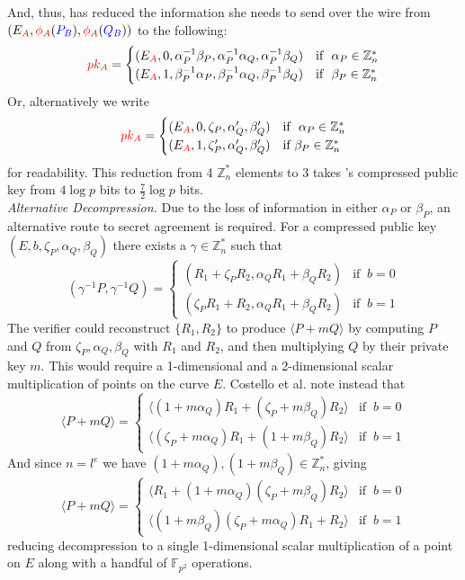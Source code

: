 \noindent
And, thus, \alice has reduced the information she needs to send over the wire from $(E_{\textcolor{red}{A}}, \textcolor{red}{\phi_A}(\textcolor{blue}{P_B}), \textcolor{red}{\phi_A}(\textcolor{blue}{Q_B}))$ to the following:
$$
\textcolor{red}{pk_A} = \begin{cases}
	   (E_{\textcolor{red}{A}}, 0, \alpha^{-1}_{P}\beta_{P}, \alpha^{-1}_{P}\alpha_{Q}, \alpha^{-1}_{P}\beta_{Q}) & \text{if }\ \alpha_{P} \in \mathbb{Z}^{*}_{n}\\
	   (E_{\textcolor{red}{A}}, 1, \beta^{-1}_{P}\alpha_{P}, \beta^{-1}_{P}\alpha_{Q}, \beta^{-1}_{P}\beta_{Q}) & \text{if }\ \beta_{P} \in \mathbb{Z}^{*}_{n}
	   \end{cases}
$$
Or, alternatively we write
$$
\textcolor{red}{pk_A} = \begin{cases}
	   (E_{\textcolor{red}{A}}, 0, \zeta_{P}, \alpha'_{Q}, \beta'_{Q}) & \text{if }\ \alpha_{P} \in \mathbb{Z}^{*}_{n}\\
	   (E_{\textcolor{red}{A}}, 1, \zeta'_{P}, \alpha'_{Q}, \beta'_{Q}) & \text{if}\ \beta_{P} \in \mathbb{Z}^{*}_{n}
	   \end{cases}
$$
for readability. This reduction from 4 $\mathbb{Z}^{*}_{n}$ elements to 3 takes \alice's compressed public key from $4\log p$ bits to $\frac{7}{2}\log p$ bits.\\

\noindent
\textit{Alternative Decompression.} Due to the loss of information in either $\alpha_{P}$ or $\beta_{P}$, an alternative route to secret agreement is required. For a compressed public key $(E, b, \zeta_{P}, \alpha_{Q}, \beta_{Q})$ there exists a $\gamma \in \mathbb{Z}^{*}_{n}$ such that
$$
(\gamma^{-1}P, \gamma^{-1}Q) =
\begin{cases}
(R_1 + \zeta_{P}R_2, \alpha_{Q}R_1 + \beta_{Q}R_2) & \text{if }\ b = 0\\
(\zeta_{P}R_1 + R_2, \alpha_{Q}R_1 + \beta_{Q}R_2) & \text{if }\ b = 1
\end{cases}
$$
The verifier could reconstruct $\{R_1, R_2\}$ to produce $\langle P + mQ \rangle$ by computing $P$ and $Q$ from $\zeta_{P}, \alpha_{Q}, \beta_{Q}$ with $R_1$ and $R_2$, and then multiplying $Q$ by their private key $m$. This would require a 1-dimensional and a 2-dimensional scalar multiplication of points on the curve $E$. Costello et al. note instead that
$$
\langle P + mQ \rangle =
\begin{cases}
\langle (1 + m\alpha_{Q}) R_1 + (\zeta_{P} + m\beta_{Q})R_2 \rangle & \text{if }\ b = 0\\
\langle (\zeta_{P} + m\alpha_{Q})R_1 + (1 + m\beta_{Q})R_2 \rangle & \text{if }\ b = 1
\end{cases}
$$
And since $n=l^{e}$ we have $(1 + m\alpha_{Q}), (1 + m\beta_{Q}) \in \mathbb{Z}^{*}_{n}$, giving
$$
\langle P + mQ \rangle =
\begin{cases}
\langle R_1 + (1 + m\alpha_{Q})(\zeta_{P} + m\beta_{Q})R_2 \rangle & \text{if }\ b = 0\\
\langle (1 + m\beta_{Q})(\zeta_{P} + m\alpha_{Q})R_1 + R_2 \rangle & \text{if }\ b = 1
\end{cases}
$$
reducing decompression to a single 1-dimensional scalar multiplication of a point on $E$ along with a handful of $\mathbb{F}_{p^{2}}$ operations.


